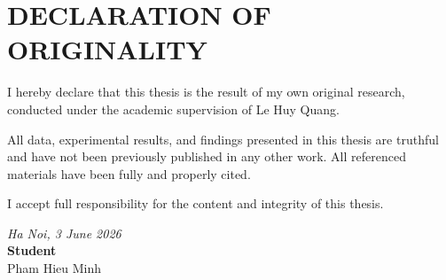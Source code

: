 
\chapter*{DECLARATION OF ORIGINALITY}

I hereby declare that this thesis is the result of my own original research, conducted under the academic supervision of Le Huy Quang.

All data, experimental results, and findings presented in this thesis are truthful and have not been previously published in any other work. All referenced materials have been fully and properly cited.

I accept full responsibility for the content and integrity of this thesis.

\vspace{2cm}

\begin{flushright}
\textit{Ha Noi, 3 June 2026}\\[1.5cm]
\textbf{Student}\\[1.5cm]
Pham Hieu Minh
\end{flushright}

